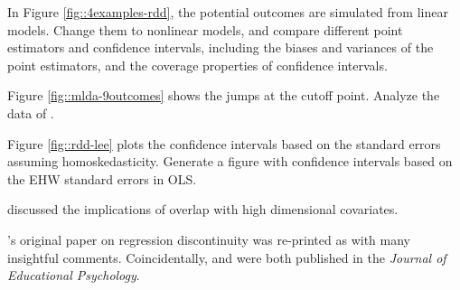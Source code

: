 \begin{HomeworkProblem}\label{exr:20-3}

In Figure \ref{fig::4examples-rdd}, the potential outcomes are simulated from linear models. Change them to nonlinear models, and compare different point estimators and confidence intervals, including the biases and variances of the point estimators, and the coverage properties of confidence intervals.



\end{HomeworkProblem}

\begin{HomeworkProblem}\label{exr:20-4}


Figure \ref{fig::mlda-9outcomes} shows the jumps at the cutoff point.
Analyze the data  of \citet{carpenter2009effect}.

\end{HomeworkProblem}

\begin{HomeworkProblem}\label{exr:20-5}

Figure \ref{fig::rdd-lee} plots the confidence intervals based on the standard errors assuming homoskedasticity. Generate a figure with confidence intervals based on the EHW standard errors in OLS.




\end{HomeworkProblem}

\begin{HomeworkProblem}\label{exr:20-6}

\citet{d2017overlap} discussed the implications of overlap with high dimensional covariates.

\citet{thistlethwaite1960regression}'s original paper on regression discontinuity was re-printed as \citet{thistlewaiteregression2016obs} with many insightful comments.  Coincidentally, \citet{thistlethwaite1960regression} and \citet{Rubin:1974} were both published in the {\it Journal of Educational Psychology}.

\end{HomeworkProblem}
